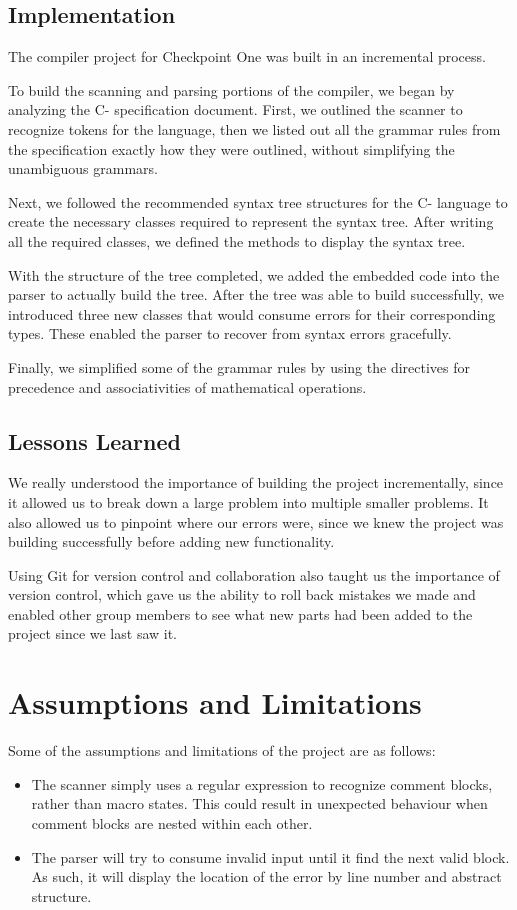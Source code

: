 \documentclass[12pt,letterpaper]{article}
\begin{document}
\subsection{Implementation}
The compiler project for Checkpoint One was built in an incremental process.\par
To build the scanning and parsing portions of the compiler, we began by analyzing the C- specification document. First, we outlined the scanner to recognize tokens for the language, then we listed out all the grammar rules from the specification exactly how they were outlined, without simplifying the unambiguous grammars.\par
Next, we followed the recommended syntax tree structures for the C- language to create the necessary classes required to represent the syntax tree. After writing all the required classes, we defined the methods to display the syntax tree.\par
With the structure of the tree completed, we added the embedded code into the parser to actually build the tree. After the tree was able to build successfully, we introduced three new classes that would consume errors for their corresponding types. These enabled the parser to recover from syntax errors gracefully.\par
Finally, we simplified some of the grammar rules by using the directives for precedence and associativities of mathematical operations.\par

\subsection{Lessons Learned}
We really understood the importance of building the project incrementally, since it allowed us to break down a large problem into multiple smaller problems. It also allowed us to pinpoint where our errors were, since we knew the project was building successfully before adding new functionality.\par
Using Git for version control and collaboration also taught us the importance of version control, which gave us the ability to roll back mistakes we made and enabled other group members to see what new parts had been added to the project since we last saw it.\par

\section{Assumptions and Limitations}
Some of the assumptions and limitations of the project are as follows:
\begin{itemize}[leftmargin=12pt]
\item The scanner simply uses a regular expression to recognize comment blocks, rather than macro states. This could result in unexpected behaviour when comment blocks are nested within each other.
\item The parser will try to consume invalid input until it find the next valid block. As such, it will display the location of the error by line number and abstract structure.
\end{itemize}
\end{document}

